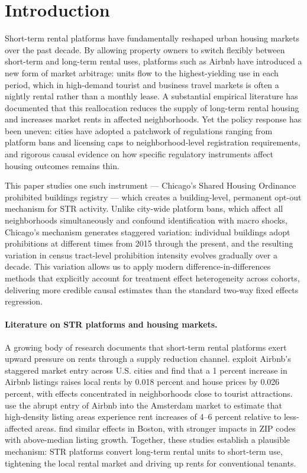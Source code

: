 \section{Introduction}\label{sec:intro}

Short-term rental platforms have fundamentally reshaped urban housing markets over the past decade. By allowing property owners to switch flexibly between short-term and long-term rental uses, platforms such as Airbnb have introduced a new form of market arbitrage: units flow to the highest-yielding use in each period, which in high-demand tourist and business travel markets is often a nightly rental rather than a monthly lease. A substantial empirical literature has documented that this reallocation reduces the supply of long-term rental housing and increases market rents in affected neighborhoods. Yet the policy response has been uneven: cities have adopted a patchwork of regulations ranging from platform bans and licensing caps to neighborhood-level registration requirements, and rigorous causal evidence on how specific regulatory instruments affect housing outcomes remains thin.

This paper studies one such instrument --- Chicago's Shared Housing Ordinance prohibited buildings registry --- which creates a building-level, permanent opt-out mechanism for STR activity. Unlike city-wide platform bans, which affect all neighborhoods simultaneously and confound identification with macro shocks, Chicago's mechanism generates staggered variation: individual buildings adopt prohibitions at different times from 2015 through the present, and the resulting variation in census tract-level prohibition intensity evolves gradually over a decade. This variation allows us to apply modern difference-in-differences methods that explicitly account for treatment effect heterogeneity across cohorts, delivering more credible causal estimates than the standard two-way fixed effects regression.

\paragraph{Literature on STR platforms and housing markets.} A growing body of research documents that short-term rental platforms exert upward pressure on rents through a supply reduction channel. \citet{barron2021effect} exploit Airbnb's staggered market entry across U.S. cities and find that a 1 percent increase in Airbnb listings raises local rents by 0.018 percent and house prices by 0.026 percent, with effects concentrated in neighborhoods close to tourist attractions. \citet{koster2021too} use the abrupt entry of Airbnb into the Amsterdam market to estimate that high-density listing areas experience rent increases of 4--6 percent relative to less-affected areas. \citet{horn2017is} find similar effects in Boston, with stronger impacts in ZIP codes with above-median listing growth. Together, these studies establish a plausible mechanism: STR platforms convert long-term rental units to short-term use, tightening the local rental market and driving up rents for conventional tenants.

